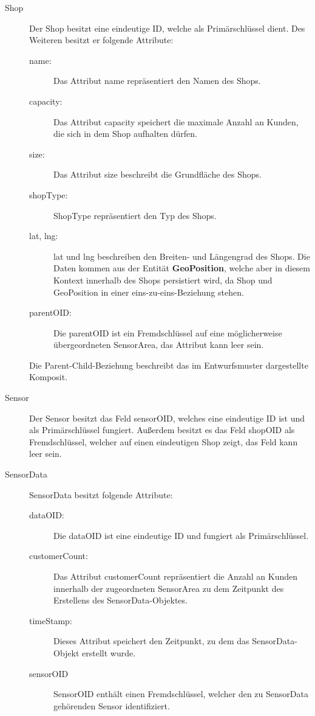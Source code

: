 \documentclass[runningheads]{llncs}
\begin{document}
\begin{description}
	\item[Shop] Der Shop besitzt eine eindeutige ID, welche als Primärschlüssel dient. 
	Des Weiteren besitzt er folgende Attribute: 
	\begin{description}
		\item [name:] Das Attribut name repräsentiert den Namen des Shops.
		\item [capacity:] Das Attribut capacity speichert die maximale Anzahl an Kunden, die sich in dem Shop aufhalten dürfen.
		\item [size:] Das Attribut size beschreibt die Grundfläche des Shops.
		\item [shopType:] ShopType repräsentiert den Typ des Shops.
		\item [lat, lng:] lat und lng beschreiben den Breiten- und Längengrad des Shops. Die Daten kommen aus der Entität \textbf{GeoPosition}, welche aber in diesem Kontext innerhalb des Shops persistiert wird, da Shop und GeoPosition in einer eins-zu-eins-Beziehung stehen.
		\item [parentOID:] Die parentOID ist ein Fremdschlüssel auf eine möglicherweise übergeordneten SensorArea, das Attribut kann leer sein.
	\end{description} 
	Die Parent-Child-Beziehung beschreibt das im Entwurfsmuster dargestellte Komposit.
	\item[Sensor] Der Sensor besitzt das Feld sensorOID, welches eine eindeutige ID ist und als Primärschlüssel fungiert. Außerdem besitzt es das Feld shopOID als Fremdschlüssel, welcher auf einen eindeutigen Shop zeigt, das Feld kann leer sein.
	\item[SensorData] SensorData besitzt folgende Attribute:
	\begin{description}
		\item[dataOID:] Die dataOID ist eine eindeutige ID und fungiert als Primärschlüssel.
		\item[customerCount:] Das Attribut customerCount repräsentiert die Anzahl an Kunden innerhalb der zugeordneten SensorArea zu dem Zeitpunkt des Erstellens des SensorData-Objektes.
		\item[timeStamp:] Dieses Attribut speichert den Zeitpunkt, zu dem das SensorData-Objekt erstellt wurde.
		\item[sensorOID] SensorOID enthält einen Fremdschlüssel, welcher den zu SensorData gehörenden Sensor identifiziert.
	\end{description}
\end{description}
\end{document}
